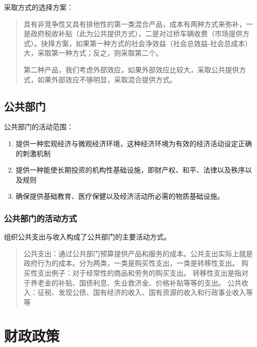 \documentclass[
]{book}
\providecommand{\tightlist}{%
  \setlength{\itemsep}{0pt}\setlength{\parskip}{0pt}}
\theoremstyle{definition}
\theoremstyle{definition}
\theoremstyle{definition}
\theoremstyle{definition}
\theoremstyle{remark}
\begin{document}
采取方式的选择方案：

\begin{quote}
具有非竞争性又具有排他性的第一类混合产品，成本有两种方式来弥补，一是政府税收补贴（此为公共提供方式），二是对过桥车辆收费（市场提供方式）。抉择方案，如果第一种方式的社会净效益（社会总效益-社会总成本）大，采取第一种方式；反之，则采取第二个。

第二种产品，我们考虑外部效应，如果外部效应比较大，采取公共提供方式，如果外部效应不够明显，采取混合提供方式。
\end{quote}

\hypertarget{ux516cux5171ux90e8ux95e8}{%
\subsection{公共部门}\label{ux516cux5171ux90e8ux95e8}}

公共部门的活动范围：

\begin{enumerate}
\def\labelenumi{\arabic{enumi}.}
\tightlist
\item
  提供一种宏观经济与微观经济环境，这种经济环境为有效的经济活动设定正确的刺激机制
\item
  提供一种能使长期投资的机构性基础设施，即财产权、和平、法律以及秩序以及规则
\item
  确保提供基础教育、医疗保健以及经济活动所必需的物质基础设施。
\end{enumerate}

\hypertarget{ux516cux5171ux90e8ux95e8ux7684ux6d3bux52a8ux65b9ux5f0f}{%
\subsubsection{公共部门的活动方式}\label{ux516cux5171ux90e8ux95e8ux7684ux6d3bux52a8ux65b9ux5f0f}}

组织公共支出与收入构成了公共部门的主要活动方式。

\begin{quote}
公共支出：通过公共部门预算提供产品和服务的成本。公共支出实际上就是政府行为的成本。分为两类，一类是购买性支出，一类是转移性支出。
购买性支出例子：对于经常性的商品和劳务的购买支出。
转移性支出是指对于养老金的补贴、国债利息、失业救济金、价格补贴等等的支出。
公共收入：征税、发现公债、国有经济的收入、国有资源的收入和行政事业收入等等
\end{quote}

\hypertarget{ux8d22ux653fux653fux7b56}{%
\section{财政政策}\label{ux8d22ux653fux653fux7b56}}
\end{document}
